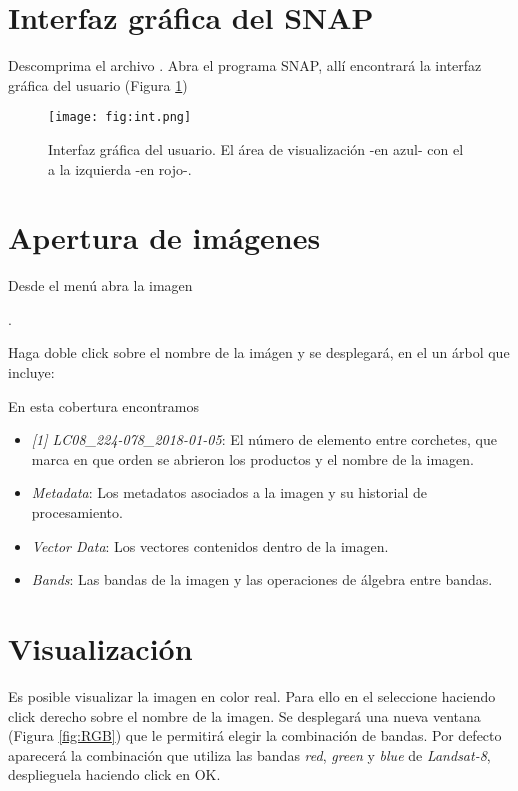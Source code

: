 \section{Interfaz gráfica del SNAP}

Descomprima el archivo . Abra el programa SNAP, allí encontrará la interfaz gráfica del usuario (Figura \ref{fig:int})

\begin{figure}[h!]
    \centering
    \texttt{[image: fig:int.png]}
    \caption{Interfaz gráfica del usuario. El área de visualización -en azul- con el  a la izquierda -en rojo-.}
    \label{fig:int}
\end{figure}

\section{Apertura de imágenes}

Desde el menú  abra la imagen
\begin{center} .
\end{center}
Haga doble click sobre el nombre de la imágen y se desplegará, en el  un árbol que incluye:
\\

En esta cobertura encontramos

\begin{itemize}
    \item \emph{[1] LC08\_224-078\_2018-01-05}: El número de elemento entre corchetes, que marca en que orden se abrieron los productos y el nombre de la imagen.
    \item \emph{Metadata}: Los metadatos asociados a la imagen y su historial de procesamiento.
    \item \emph{Vector Data}: Los vectores contenidos dentro de la imagen.
    \item \emph{Bands}: Las bandas de la imagen y las operaciones de álgebra entre bandas.
\end{itemize}

\section{Visualización}

Es posible visualizar la imagen en color real. Para ello en el  seleccione  haciendo click derecho sobre el nombre de la imagen. Se desplegará una nueva ventana (Figura \ref{fig:RGB}) que le permitirá elegir la combinación de bandas. Por defecto aparecerá la combinación que utiliza las bandas \emph{red}, \emph{green} y \emph{blue} de \emph{Landsat-8}, desplieguela haciendo click en OK.

